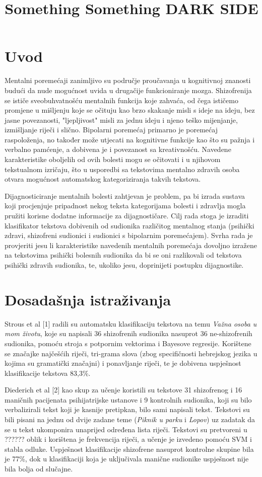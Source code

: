 \documentclass[10pt, a4paper]{article}
\title{Something Something DARK SIDE}
\begin{document}
\maketitleabstract

\section{Uvod}

Mentalni poremećaji zanimljivo su područje proučavanja u kognitivnoj znanosti budući da nude mogućnost uvida u drugačije funkcioniranje mozga. Shizofrenija se ističe sveobuhvatnošću mentalnih funkcija koje zahvaća, od čega ističemo promjene u mišljenju koje se očituju kao brzo skakanje misli s ideje na ideju, bez jasne povezanosti, "ljepljivost" misli za jednu ideju i njeno teško mijenjanje, izmišljanje riječi i slično. Bipolarni poremećaj primarno je poremećaj raspoloženja, no također može utjecati na kognitivne funkcije kao što su pažnja i verbalno pamćenje, a dobivena je i povezanost sa kreativnošću. Navedene karakteristike oboljelih od ovih bolesti mogu se očitovati i u njihovom tekstualnom izričaju, što u usporedbi sa tekstovima mentalno zdravih osoba otvara mogućnost automatskog kategoriziranja takvih tekstova. 

Dijagnosticiranje mentalnih bolesti zahtjevan je problem, pa bi izrada sustava koji procjenjuje pripadnost nekog teksta kategorijama bolesti i zdravlja mogla pružiti korisne dodatne informacije za dijagnostičare. Cilj rada stoga je izraditi klasifikator tekstova dobivenih od sudionika različitog mentalnog stanja (psihički zdravi, shizofreni sudionici i sudionici s bipolarnim poremećajem). Svrha rada je provjeriti jesu li karakteristike navedenih mentalnih poremećaja dovoljno izražene na tekstovima psihički bolesnih sudionika da bi se oni razlikovali od tekstova psihički zdravih sudionika, te, ukoliko jesu, doprinijeti postupku dijagnostike.

\section{Dosadašnja istraživanja}
Strous et al [1] radili su automatsku klasifikaciju tekstova na temu \emph{Važna osoba u mom životu}, koje su napisali 36 shizofrenih sudionika nasuprot 36 ne-shizofrenih sudionika, pomoću stroja s potpornim vektorima  i Bayesove regresije. Korištene se značajke najčešćih riječi, tri-grama slova (zbog specifičnosti hebrejskog jezika u kojima su gramatički značajni) i ponavljanje riječi, te je dobivena uspješnost klasifikacije tekstova 83,3\%.

Diederich et al [2] kao skup za učenje koristili su tekstove 31 shizofrenog i 16 maničnih pacijenata psihijatrijske ustanove i 9 kontrolnih sudionika, koji su bilo verbalizirali tekst koji je kasnije pretipkan, bilo sami napisali tekst. Tekstovi su bili pisani na jednu od dvije zadane teme (\emph{Piknik u parku} i \emph{Lopov}) uz zadatak da se u tekst ukomponira unaprijed određena lista riječi. Tekstovi su pretvoreni u ??????  oblik i korištena je frekvencija riječi, a učenje je izvedeno pomoću SVM i stabla odluke. Uspješnost klasifikacije shizofrene nasuprot kontrolne skupine bila je 77\%, dok u klasifikaciji koja je uključivala manične sudionike uspješnost nije bila bolja od slučajne. 
\end{document}
